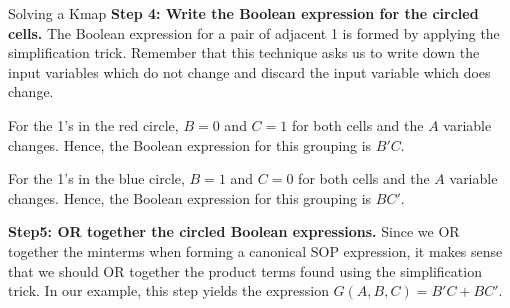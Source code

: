 \begin{process}{Solving a Kmap}
\textbf{Step 4: Write the Boolean expression for the circled cells.}
The Boolean expression for a pair of adjacent 1 is formed by applying
the simplification trick.  Remember that this
technique asks us to write down the input variables which do 
not change and discard the input variable which does change.

For the 1's in the red circle, $B=0$ and $C=1$ for 
both cells and the $A$ variable changes.  Hence, the 
Boolean expression for this grouping is $B'C$.  

For the 1's in the blue circle, $B=1$ and $C=0$ for 
both cells and the $A$ variable changes.  Hence, the 
Boolean expression for this grouping is $BC'$.  


\textbf{Step5: OR together the circled Boolean expressions.}
Since we OR together the minterms when forming a canonical SOP 
expression, it makes sense that we should OR together the product
terms found using the simplification trick.
In our example, this step yields the \SOPmin expression  $G(A,B,C) = B'C + BC'$.
\end{process}

